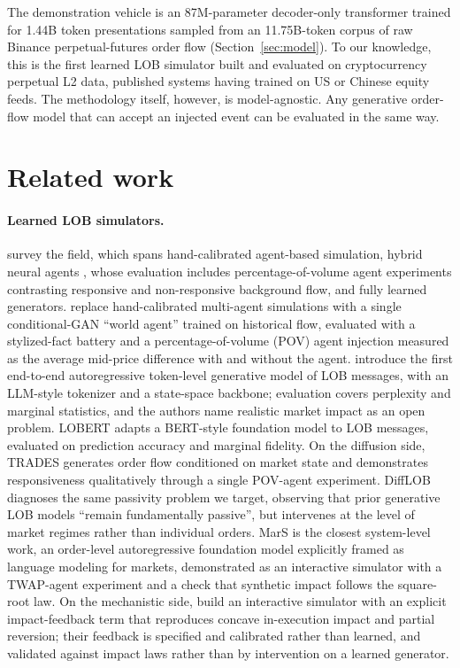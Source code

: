 \documentclass[11pt]{article}
\begin{document}
The demonstration vehicle is an 87M-parameter decoder-only transformer trained for 1.44B token presentations sampled from an 11.75B-token corpus of raw Binance perpetual-futures order flow (Section~\ref{sec:model}). To our knowledge, this is the first learned LOB simulator built and evaluated on cryptocurrency perpetual L2 data, published systems having trained on US or Chinese equity feeds. The methodology itself, however, is model-agnostic. Any generative order-flow model that can accept an injected event can be evaluated in the same way.

\section{Related work}
\label{sec:related}

\paragraph{Learned LOB simulators.} \citet{jain2024} survey the field, which spans hand-calibrated agent-based simulation, hybrid neural agents \citep{shi2023}, whose evaluation includes percentage-of-volume agent experiments contrasting responsive and non-responsive background flow, and fully learned generators. \citet{coletta2021,coletta2022} replace hand-calibrated multi-agent simulations \citep{abides2019} with a single conditional-GAN ``world agent'' trained on historical flow, evaluated with a stylized-fact battery and a percentage-of-volume (POV) agent injection measured as the average mid-price difference with and without the agent. \citet{nagy2023} introduce the first end-to-end autoregressive token-level generative model of LOB messages, with an LLM-style tokenizer and a state-space backbone; evaluation covers perplexity and marginal statistics, and the authors name realistic market impact as an open problem. LOBERT \citep{lobert2025} adapts a BERT-style foundation model to LOB messages, evaluated on prediction accuracy and marginal fidelity. On the diffusion side, TRADES \citep{trades2025} generates order flow conditioned on market state and demonstrates responsiveness qualitatively through a single POV-agent experiment. DiffLOB \citep{difflob2026} diagnoses the same passivity problem we target, observing that prior generative LOB models ``remain fundamentally passive'', but intervenes at the level of market regimes rather than individual orders. MarS \citep{mars2025} is the closest system-level work, an order-level autoregressive foundation model explicitly framed as language modeling for markets, demonstrated as an interactive simulator with a TWAP-agent experiment and a check that synthetic impact follows the square-root law. On the mechanistic side, \citet{noble2026} build an interactive simulator with an explicit impact-feedback term that reproduces concave in-execution impact and partial reversion; their feedback is specified and calibrated rather than learned, and validated against impact laws rather than by intervention on a learned generator.
\end{document}
